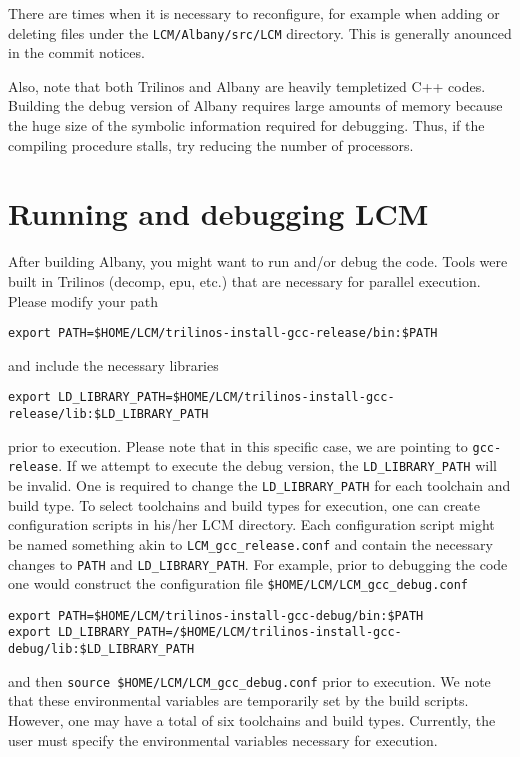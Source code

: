 \documentclass[10pt,a4paper]{article} \usepackage[utf8]{inputenc}
\begin{document}
There are times when it is necessary to reconfigure, for example when
adding or deleting files under the \verb+LCM/Albany/src/LCM+
directory. This is generally anounced in the commit notices.

Also, note that both Trilinos and Albany are heavily templetized C++
codes. Building the debug version of Albany requires large amounts of
memory because the huge size of the symbolic information required for
debugging. Thus, if the compiling procedure stalls, try reducing the
number of processors.

\section{Running and debugging LCM} 

After building Albany, you might want to run and/or debug the code. 
Tools were built in Trilinos (decomp, epu, etc.) that are necessary for parallel execution. 
Please modify your path
\begin{verbatim}
export PATH=$HOME/LCM/trilinos-install-gcc-release/bin:$PATH
\end{verbatim}
and include the necessary libraries
\begin{verbatim}
export LD_LIBRARY_PATH=$HOME/LCM/trilinos-install-gcc-release/lib:$LD_LIBRARY_PATH
\end{verbatim}
prior to execution. Please note that in this specific case, we are pointing to 
\verb+gcc-release+.
If we attempt to execute the debug version, the \verb+LD_LIBRARY_PATH+ will be invalid.
One is required to change the  \verb+LD_LIBRARY_PATH+ for each toolchain and build type.
To select toolchains and build types for execution, one can create configuration scripts in his/her LCM
directory. Each configuration script might be named something akin to \verb+LCM_gcc_release.conf+ 
and contain the necessary changes to \verb+PATH+ and \verb+LD_LIBRARY_PATH+. For example,
prior to debugging the code one would construct the configuration file  
\verb+$HOME/LCM/LCM_gcc_debug.conf+
\begin{verbatim}
export PATH=$HOME/LCM/trilinos-install-gcc-debug/bin:$PATH
export LD_LIBRARY_PATH=/$HOME/LCM/trilinos-install-gcc-debug/lib:$LD_LIBRARY_PATH
\end{verbatim}
and then \verb+source $HOME/LCM/LCM_gcc_debug.conf+ prior to execution. We note that these 
environmental variables are temporarily set by the build scripts. However, one may have a total of six
toolchains and build types. Currently, the user must specify the environmental variables 
necessary for execution. 
\end{document}
